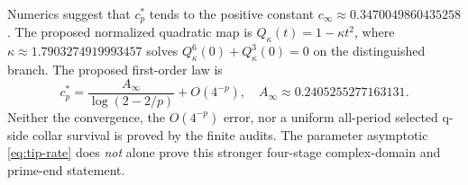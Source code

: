 \begin{question}\label{q:crest}
Numerics suggest that
$c_p^*$ tends to the
positive constant
$c_\infty\approx0.3470049860435258$.
The proposed normalized
quadratic map is
$Q_\kappa(t)=1-\kappa t^2$,
where $\kappa\approx1.7903274919993457$
solves
$Q_\kappa^6(0)+Q_\kappa^3(0)=0$
on the distinguished branch.
The proposed first-order
law is
\[
 c_p^*=
 \frac{A_\infty}{\log(2-2/p)}
       +O(4^{-p}),\quad
 A_\infty\approx0.2405255277163131.
\]
Neither the convergence,
the $O(4^{-p})$ error,
nor a uniform all-period
selected q-side collar
survival is proved by
the finite audits.
The parameter asymptotic
\eqref{eq:tip-rate}
does \emph{not} alone
prove this stronger
four-stage
complex-domain and
prime-end statement.
\end{question}

